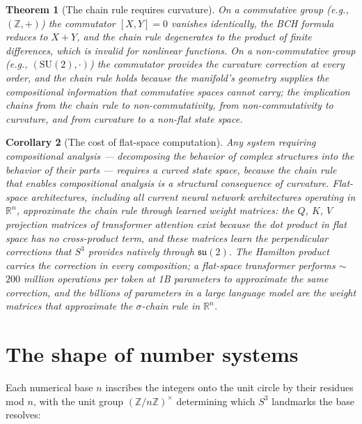 \documentclass[12pt]{article}
\newtheorem{theorem}{Theorem}[section]
\newtheorem{corollary}[theorem]{Corollary}
\begin{document}
\begin{theorem}[The chain rule requires curvature]
    On a commutative group (e.g., $(\mathbb{Z}, +)$) the commutator $[X,Y] = 0$ vanishes identically, the BCH formula reduces to $X + Y$, and the chain rule degenerates to the product of finite differences, which is invalid for nonlinear functions. On a non-commutative group (e.g., $(\mathrm{SU}(2), \cdot)$) the commutator provides the curvature correction at every order, and the chain rule holds because the manifold's geometry supplies the compositional information that commutative spaces cannot carry; the implication chains from the chain rule to non-commutativity, from non-commutativity to curvature, and from curvature to a non-flat state space.
\end{theorem}

\begin{corollary}[The cost of flat-space computation]
    Any system requiring compositional analysis --- decomposing the behavior of complex structures into the behavior of their parts --- requires a curved state space, because the chain rule that enables compositional analysis is a structural consequence of curvature. Flat-space architectures, including all current neural network architectures operating in $\mathbb{R}^n$, approximate the chain rule through learned weight matrices: the $Q$, $K$, $V$ projection matrices of transformer attention exist because the dot product in flat space has no cross-product term, and these matrices learn the perpendicular corrections that $S^3$ provides natively through $\mathfrak{su}(2)$. The Hamilton product carries the correction in every composition; a flat-space transformer performs $\sim$$200$ million operations per token at 1B parameters to approximate the same correction, and the billions of parameters in a large language model are the weight matrices that approximate the $\sigma$-chain rule in $\mathbb{R}^n$.
\end{corollary}


\section{The shape of number systems}

Each numerical base $n$ inscribes the integers onto the unit circle by their residues mod $n$, with the unit group $(\mathbb{Z}/n\mathbb{Z})^\times$ determining which $S^3$ landmarks the base resolves:
\end{document}
